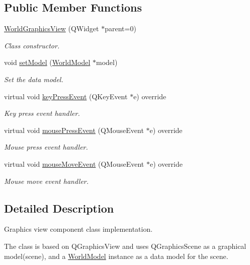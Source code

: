 \subsection*{Public Member Functions}
\begin{DoxyCompactItemize}
\item 
\hyperlink{classWorldGraphicsView_aac181c5fb59c553a885afc62c9f58576}{World\+Graphics\+View} (Q\+Widget $\ast$parent=0)
\begin{DoxyCompactList}\small\item\em Class constructor. \end{DoxyCompactList}\item 
void \hyperlink{classWorldGraphicsView_ac9bfe6153b0106f0cb6591b511f9391a}{set\+Model} (\hyperlink{classWorldModel}{World\+Model} $\ast$model)
\begin{DoxyCompactList}\small\item\em Set the data model. \end{DoxyCompactList}\item 
virtual void \hyperlink{classWorldGraphicsView_abdb212ddc141fdc73054bab7b5320d51}{key\+Press\+Event} (Q\+Key\+Event $\ast$e) override
\begin{DoxyCompactList}\small\item\em Key press event handler. \end{DoxyCompactList}\item 
virtual void \hyperlink{classWorldGraphicsView_af4b8a71cfd9f363c8056a506ef60344c}{mouse\+Press\+Event} (Q\+Mouse\+Event $\ast$e) override
\begin{DoxyCompactList}\small\item\em Mouse press event handler. \end{DoxyCompactList}\item 
virtual void \hyperlink{classWorldGraphicsView_a07a8843b73603a3eb71f768308aa5310}{mouse\+Move\+Event} (Q\+Mouse\+Event $\ast$e) override
\begin{DoxyCompactList}\small\item\em Mouse move event handler. \end{DoxyCompactList}\end{DoxyCompactItemize}


\subsection{Detailed Description}
Graphics view component class implementation. 

The class is based on Q\+Graphics\+View and uses Q\+Graphics\+Scene as a graphical model(scene), and a \hyperlink{classWorldModel}{World\+Model} instance as a data model for the scene. 

